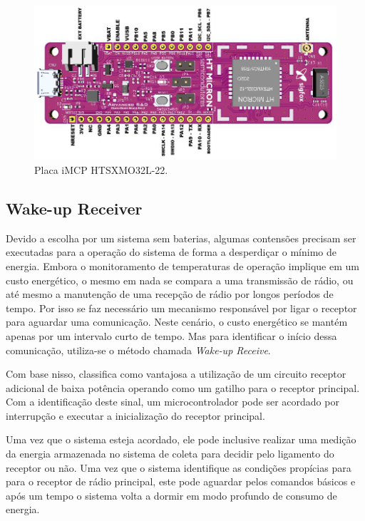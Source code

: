\begin{figure}
  \caption{Placa iMCP HTSXMO32L-22.}
  \begin{center}
      \includegraphics[scale=0.5]{img/placa.png}
  \end{center}
  \label{fig:placaHT32SX}
\end{figure}

\subsection{Wake-up Receiver}
Devido a escolha por um sistema sem baterias, algumas contensões precisam ser executadas para a operação do sistema de forma a desperdiçar o mínimo de energia. Embora o monitoramento de temperaturas de operação implique em um custo energético, o mesmo em nada se compara a uma transmissão de rádio, ou até mesmo a manutenção de uma recepção de rádio por longos períodos de tempo. Por isso se faz necessário um mecanismo responsável por ligar o receptor para aguardar uma comunicação. Neste cenário, o custo energético se mantém apenas por um intervalo curto de tempo. Mas para identificar o início dessa comunicação, utiliza-se o método chamada \textit{Wake-up Receive}. 

Com base nisso,  classifica como vantajosa a utilização de um circuito receptor adicional de baixa potência operando como um gatilho para o receptor principal. Com a identificação deste sinal, um microcontrolador pode ser acordado por interrupção e executar a inicialização do receptor principal.

Uma vez que o sistema esteja acordado, ele pode inclusive realizar uma medição da energia armazenada no sistema de coleta para decidir pelo ligamento do receptor ou não. Uma vez que o sistema identifique as condições propícias para para o receptor de rádio principal, este pode aguardar pelos comandos básicos e após um tempo o sistema volta a dormir em modo profundo de consumo de energia.
